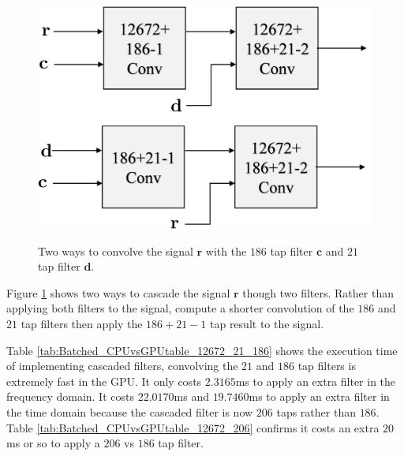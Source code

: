 \begin{figure}
	\caption{Two ways to convolve the signal $\mathbf{r}$ with the $186$ tap filter $\mathbf{c}$ and $21$ tap filter $\mathbf{d}$.}
	\centering\includegraphics[width=5.01in/100*55]{figures/gpu_intro/twoWaysToConv.pdf}
	\label{fig:twoWaysToConv}
\end{figure}
Figure \ref{fig:twoWaysToConv} shows two ways to cascade the signal $\mathbf{r}$ though two filters.
Rather than applying both filters to the signal, compute a shorter convolution of the $186$ and $21$ tap filters then apply the $186+21-1$ tap result to the signal.

Table \ref{tab:Batched_CPUvsGPUtable_12672_21_186} shows the execution time of implementing cascaded filters, convolving the $21$ and $186$ tap filters is extremely fast in the GPU.
It only costs $2.3165$ms to apply an extra filter in the frequency domain.
It costs $22.0170$ms and $19.7460$ms to apply an extra filter in the time domain because the cascaded filter is now $206$ taps rather than $186$.
Table \ref{tab:Batched_CPUvsGPUtable_12672_206} confirms it costs an extra $20$ms or so to apply a $206$ vs $186$ tap filter.

